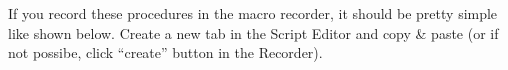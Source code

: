 If you record these procedures in the macro recorder, it should be pretty simple like shown below. Create a new tab in the Script Editor and copy \& paste (or if not possibe, click ``create'' button in the Recorder).